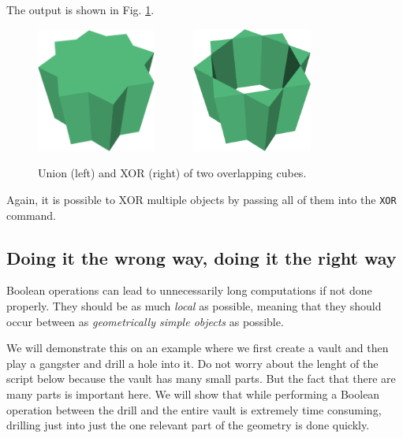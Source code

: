 \noindent
The output is shown in Fig. \ref{fig:xor-1}.
\newpage

\begin{figure}[!ht]
\begin{center}
\includegraphics[width=0.35\textwidth]{img/xor-new1a.png}\ \ \ \ \ \ \ 
\includegraphics[width=0.35\textwidth]{img/xor-new.png}
\end{center}
\vspace{-4mm}
\caption{Union (left) and XOR (right) of two overlapping cubes.}
\label{fig:xor-1}
\end{figure}
\noindent
Again, it is possible to XOR multiple objects by passing all of them 
into the {\tt XOR} command.

\subsection{Doing it the wrong way, doing it the right way}

Boolean operations can lead to unnecessarily long computations if not done 
properly. They should be as much {\em local} as possible, meaning that 
they should occur between as {\em geometrically simple objects} as possible.

We will demonstrate this on an example where we first create a vault and then play 
a gangster and drill a hole into it. Do not worry about the lenght of the script below  because
the vault has many small parts. But the fact that there are many parts is important here.
We will show that while performing a Boolean operation between the drill and the entire
vault is extremely time consuming, drilling just into just the one relevant part
of the geometry is done quickly.

